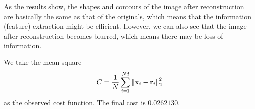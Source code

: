 \documentclass[10pt]{article}
\begin{document}
As the results show, the shapes and contours of the image after reconstruction are basically the same as that of the originals, which means that the information (feature) extraction might be efficient. However, we can also see that the image after reconstruction becomes blurred, which means there may be loss of information.\par
We take the mean square
$$C = \frac1N\sum\limits_{i = 1}^{Nd}\norm{\mathbf{x}_i - \mathbf{r}_i}_2^2$$
as the observed cost function. The final cost is $0.0262130$.
\bigskip


\end{document}

